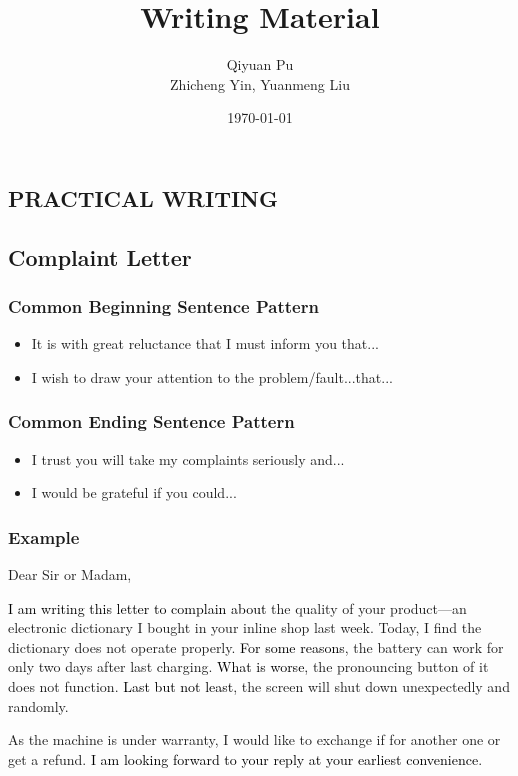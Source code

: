 \documentclass{article}
\begin{document}
\title{Writing Material}
\author{Qiyuan Pu  \\
  Zhicheng Yin, Yuanmeng Liu 
  }
\date{\today}
\maketitle

\begin{center}
  \section{PRACTICAL WRITING}
\end{center}
\label{sec:practical-writings}

\subsection{Complaint Letter}
\label{sec:complaint-letter}

\subsubsection{Common Beginning Sentence Pattern}
\label{sec:comm-beginn-sent}

\begin{itemize}
\item It is with great reluctance that I must inform you that...
\item I wish to draw your attention to the problem/fault...that...
\end{itemize}


\subsubsection{Common Ending Sentence Pattern}
\label{sec:comm-ending-sent}
\begin{itemize}
\item I trust you will take my complaints seriously and...
\item I would be grateful if you could...
\end{itemize}

\subsubsection{Example}
\label{sec:example}

Dear Sir or Madam,
\par \textcolor{black}{I am writing this letter to complain about} the quality of your product---an electronic
dictionary I bought in your inline shop last week. Today, I find the dictionary does not
operate properly. \textcolor{black}{For some reasons}, the battery can work for only two days after last
charging. \textcolor{black}{What is worse}, the pronouncing button of it does not
function. \textcolor{black}{Last but not least}, the screen will shut down unexpectedly and
randomly.
\par As the machine is under warranty, I would like to exchange if for another one or get
a refund. \textcolor{black}{I am looking forward to your reply at your earliest
  convenience}.
\end{document}
